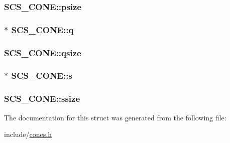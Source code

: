 \hypertarget{struct_s_c_s___c_o_n_e_a9e0fef883941e507c80f04ccae4c822a}{
\subsubsection[{psize}]{ S\-C\-S\-\_\-\-C\-O\-N\-E\-::psize}}\label{struct_s_c_s___c_o_n_e_a9e0fef883941e507c80f04ccae4c822a}
\hypertarget{struct_s_c_s___c_o_n_e_af056b31b1537a71fe87f2a32f7fa4177}{
\subsubsection[{q}]{$\ast$ S\-C\-S\-\_\-\-C\-O\-N\-E\-::q}}\label{struct_s_c_s___c_o_n_e_af056b31b1537a71fe87f2a32f7fa4177}
\hypertarget{struct_s_c_s___c_o_n_e_a8d86840460aaed0210c107627914453b}{
\subsubsection[{qsize}]{ S\-C\-S\-\_\-\-C\-O\-N\-E\-::qsize}}\label{struct_s_c_s___c_o_n_e_a8d86840460aaed0210c107627914453b}
\hypertarget{struct_s_c_s___c_o_n_e_a8400cfd0fc6f3ccdb89b6ddcc74d2732}{
\subsubsection[{s}]{$\ast$ S\-C\-S\-\_\-\-C\-O\-N\-E\-::s}}\label{struct_s_c_s___c_o_n_e_a8400cfd0fc6f3ccdb89b6ddcc74d2732}
\hypertarget{struct_s_c_s___c_o_n_e_a743ed457f561a65bc02af67d3fe1d29f}{
\subsubsection[{ssize}]{ S\-C\-S\-\_\-\-C\-O\-N\-E\-::ssize}}\label{struct_s_c_s___c_o_n_e_a743ed457f561a65bc02af67d3fe1d29f}


The documentation for this struct was generated from the following file\-:\begin{DoxyCompactItemize}
\item 
include/\hyperlink{cones_8h}{cones.\-h}\end{DoxyCompactItemize}
